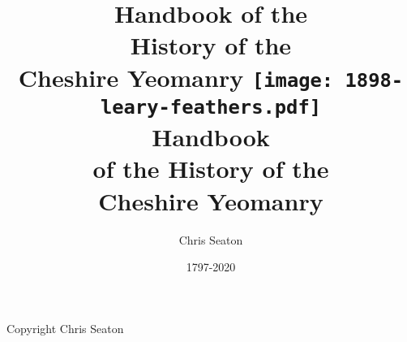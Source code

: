 \documentclass[a4paper,7pt]{book}
\title{Handbook of the \\ History of the \\ Cheshire Yeomanry}
\author{Chris Seaton}
\date{1797-2020}
\title{
  \texttt{[image: 1898-leary-feathers.pdf]} \\
  \vspace{10mm}
  \huge Handbook \\
  \vspace{2mm}
  \Large of the History of the \\
  \Huge Cheshire Yeomanry
}
\begin{document}
\frontmatter

\maketitle

\vspace*{\fill}

\begin{center}
  Copyright  Chris Seaton
\end{center}

\tableofcontents{}

\mainmatter



\end{document}
